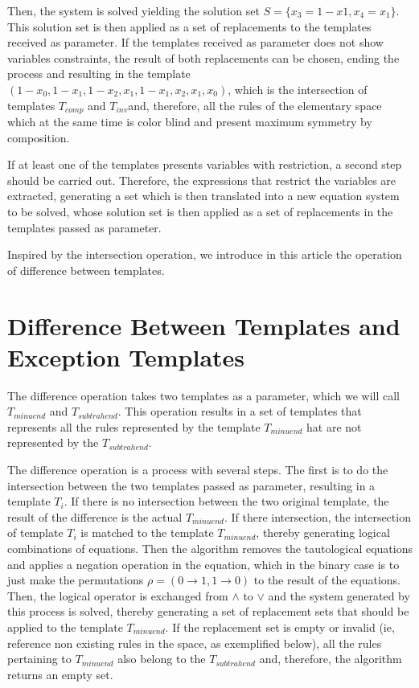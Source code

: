 \documentclass{llncs}
\begin{document}
Then, the system is solved yielding the solution set $S = \{x_3 = 1-x1, x_4 = x_1\}$. This solution set is then applied as a set of replacements to the templates received as parameter. If the templates received as parameter does not show variables constraints, the result of both replacements can be chosen, ending the process and resulting in the template $(1 - x_0, 1 - x_1, 1 - x_2, x_1, 1 - x_1, x_2, x_1, x_0)$, which is the intersection of templates $T_{comp}$ and $T_{inv}$and, therefore, all the rules of the elementary space which at the same time is color blind and present maximum symmetry by composition.

If at least one of the templates presents variables with restriction, a second step should be carried out. Therefore, the expressions that restrict the variables are extracted, generating a set which is then translated into a new equation system to be solved, whose solution set is then applied as a set of replacements in the templates passed as parameter.

Inspired by the intersection operation, we introduce in this article the operation of difference between templates.

\section{Difference Between Templates and Exception Templates}
\label{sec:diferenca_entre_templates_e_templates_de_excecao}

The difference operation takes two templates as a parameter, which we will call $T_{minuend}$ and $T_{subtrahend}$. This operation results in a set of templates that represents all the rules represented by the template $T_{minuend}$ hat are not represented by the $T_{subtrahend}$.

The difference operation is a process with several steps. The first is to do the intersection between the two templates passed as parameter, resulting in a template $T_i$. If there is no intersection between the two original template, the result of the difference is the actual $T_{minuend}$. If there intersection, the intersection of template $T_i$ is matched to the template $T_{minuend}$, thereby generating logical combinations of equations. Then the algorithm removes the tautological equations and applies a negation operation in the equation, which in the binary case is to just make the permutations $\rho = (0 \to 1, 1 \to 0)$ to the result of the equations. Then, the logical operator is exchanged from $\wedge$ to $\vee$ and the system generated by this process is solved, thereby generating a set of replacement sets that should be applied to the template $T_{minuend}$. If the replacement set is empty or invalid (ie, reference non existing rules in the space, as exemplified below), all the rules pertaining to $T_{minuend}$ also belong to the $T_{subtrahend}$ and, therefore, the algorithm returns an empty set.
\end{document}

